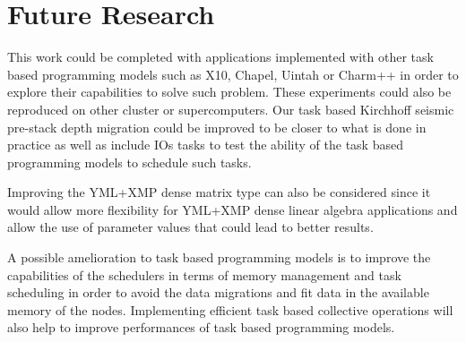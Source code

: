 \section{Future Research}

This work could be completed with applications implemented with other task based programming models such as X10, Chapel, Uintah or Charm++ in order to explore their capabilities to solve such problem.
These experiments could also be reproduced on other cluster or supercomputers.
Our task based Kirchhoff seismic pre-stack depth migration could be improved to be closer to what is done in practice as well as include IOs tasks to test the ability of the task based programming models to schedule such tasks.

Improving the YML+XMP dense matrix type can also be considered since it would allow more flexibility for YML+XMP dense linear algebra applications and allow the use of parameter values that could lead to better results.

A possible amelioration to task based programming models is to improve the capabilities of the schedulers in terms of memory management and task scheduling in order to avoid the data migrations and fit data in the available memory of the nodes.
Implementing efficient task based collective operations will also help to improve performances of task based programming models.
